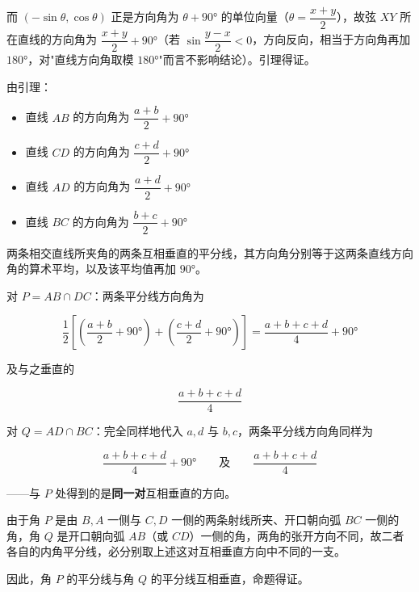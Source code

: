 \begin{answer}
而 $\left(-\sin\theta,\cos\theta\right)$ 正是方向角为 $\theta+90°$ 的单位向量（$\theta=\dfrac{x+y}2$），故弦 $XY$ 所在直线的方向角为 $\dfrac{x+y}2+90°$（若 $\sin\dfrac{y-x}2<0$，方向反向，相当于方向角再加 $180°$，对"直线方向角取模 $180°$"而言不影响结论）。引理得证。

由引理：

\begin{itemize}
\item 直线 $AB$ 的方向角为 $\dfrac{a+b}2+90°$
\item 直线 $CD$ 的方向角为 $\dfrac{c+d}2+90°$
\item 直线 $AD$ 的方向角为 $\dfrac{a+d}2+90°$
\item 直线 $BC$ 的方向角为 $\dfrac{b+c}2+90°$
\end{itemize}

两条相交直线所夹角的两条互相垂直的平分线，其方向角分别等于这两条直线方向角的算术平均，以及该平均值再加 $90°$。

对 $P=AB\cap DC$：两条平分线方向角为

\nopagebreak[4]
\[
\frac12\left[\left(\frac{a+b}2+90°\right)+\left(\frac{c+d}2+90°\right)\right]=\frac{a+b+c+d}4+90°
\]

及与之垂直的

\nopagebreak[4]
\[
\frac{a+b+c+d}4
\]

对 $Q=AD\cap BC$：完全同样地代入 $a,d$ 与 $b,c$，两条平分线方向角同样为

\nopagebreak[4]
\[
\frac{a+b+c+d}4+90°\qquad\text{及}\qquad\frac{a+b+c+d}4
\]

——与 $P$ 处得到的是\textbf{同一对}互相垂直的方向。

由于角 $P$ 是由 $B,A$ 一侧与 $C,D$ 一侧的两条射线所夹、开口朝向弧 $BC$ 一侧的角，角 $Q$ 是开口朝向弧 $AB$（或 $CD$）一侧的角，两角的张开方向不同，故二者各自的内角平分线，必分别取上述这对互相垂直方向中不同的一支。

因此，角 $P$ 的平分线与角 $Q$ 的平分线互相垂直，命题得证。



\end{answer}